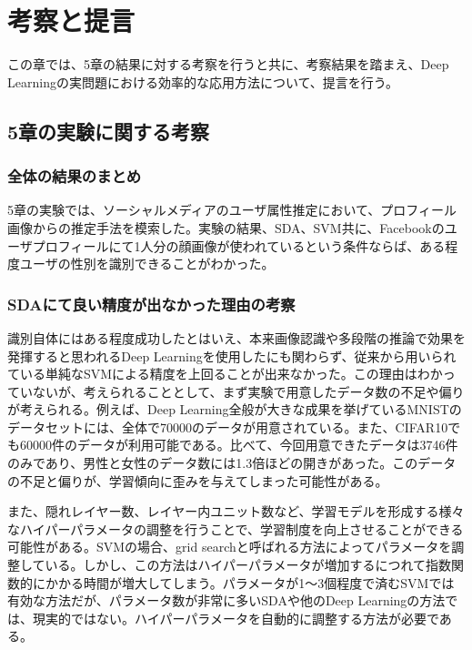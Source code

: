 \chapter{考察と提言}
この章では、5章の結果に対する考察を行うと共に、考察結果を踏まえ、Deep Learningの実問題における効率的な応用方法について、提言を行う。

\section{5章の実験に関する考察}
\subsection{全体の結果のまとめ}
5章の実験では、ソーシャルメディアのユーザ属性推定において、プロフィール画像からの推定手法を模索した。実験の結果、SDA、SVM共に、Facebookのユーザプロフィールにて1人分の顔画像が使われているという条件ならば、ある程度ユーザの性別を識別できることがわかった。\par
\subsection{SDAにて良い精度が出なかった理由の考察}
識別自体にはある程度成功したとはいえ、本来画像認識や多段階の推論で効果を発揮すると思われるDeep Learningを使用したにも関わらず、従来から用いられている単純なSVMによる精度を上回ることが出来なかった。この理由はわかっていないが、考えられることとして、まず実験で用意したデータ数の不足や偏りが考えられる。例えば、Deep Learning全般が大きな成果を挙げているMNISTのデータセットには、全体で70000のデータが用意されている。また、CIFAR10でも60000件のデータが利用可能である。比べて、今回用意できたデータは3746件のみであり、男性と女性のデータ数には1.3倍ほどの開きがあった。このデータの不足と偏りが、学習傾向に歪みを与えてしまった可能性がある。\par
また、隠れレイヤー数、レイヤー内ユニット数など、学習モデルを形成する様々なハイパーパラメータの調整を行うことで、学習制度を向上させることができる可能性がある。SVMの場合、grid searchと呼ばれる方法によってパラメータを調整している。しかし、この方法はハイパーパラメータが増加するにつれて指数関数的にかかる時間が増大してしまう。パラメータが1〜3個程度で済むSVMでは有効な方法だが、パラメータ数が非常に多いSDAや他のDeep Learningの方法では、現実的ではない。ハイパーパラメータを自動的に調整する方法が必要である。
